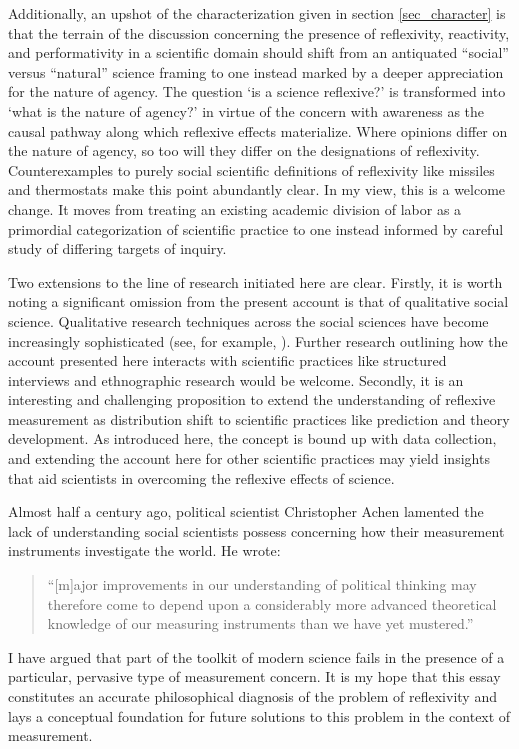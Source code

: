 Additionally, an upshot of the characterization given in section \ref{sec_character} is that the terrain of the discussion concerning the presence of reflexivity, reactivity, and performativity in a scientific domain should shift from an antiquated ``social'' versus ``natural'' science framing to one instead marked by a deeper appreciation for the nature of agency. The question `is a science reflexive?' is transformed into `what is the nature of agency?' in virtue of the concern with awareness as the causal pathway along which reflexive effects materialize. Where opinions differ on the nature of agency, so too will they differ on the designations of reflexivity. Counterexamples to purely social scientific definitions of reflexivity like missiles \autocite{grunbaum1956} and thermostats \autocite{beinhocker2013} make this point abundantly clear. In my view, this is a welcome change. It moves from treating an existing academic division of labor as a primordial categorization of scientific practice to one instead informed by careful study of differing targets of inquiry.

Two extensions to the line of research initiated here are clear. Firstly, it is worth noting a significant omission from the present account is that of qualitative social science. Qualitative research techniques across the social sciences have become increasingly sophisticated (see, for example, \cite{king2021}). Further research outlining how the account presented here interacts with scientific practices like structured interviews and ethnographic research would be welcome. Secondly, it is an interesting and challenging proposition to extend the understanding of reflexive measurement as distribution shift to scientific practices like prediction and theory development. As introduced here, the concept is bound up with data collection, and extending the account here for other scientific practices may yield insights that aid scientists in overcoming the reflexive effects of science.

Almost half a century ago, political scientist Christopher Achen lamented the lack of understanding social scientists possess concerning how their measurement instruments investigate the world. He wrote:

\begin{quote}
``[m]ajor improvements in our understanding of political thinking may therefore come to depend upon a considerably more advanced theoretical knowledge of our measuring instruments than we have yet mustered.'' \autocite[1231]{achen1975}
\end{quote}

\noindent I have argued that part of the toolkit of modern science fails in the presence of a particular, pervasive type of measurement concern. It is my hope that this essay constitutes an accurate philosophical diagnosis of the problem of reflexivity and lays a conceptual foundation for future solutions to this problem in the context of measurement.

